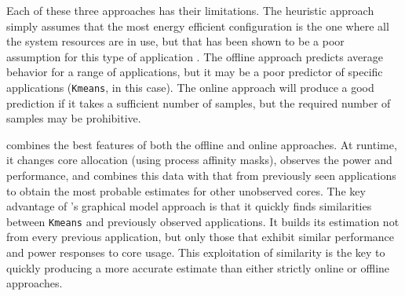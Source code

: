 Each of these three approaches has their limitations.  The heuristic
approach simply assumes that the most energy efficient configuration
is the one where all the system resources are in use, but that has
been shown to be a poor assumption for this type of application
\cite{HotPower,MeisnerISCA2011}.  The offline approach predicts
average behavior for a range of applications, but it may be a poor
predictor of specific applications (\texttt{Kmeans}, in this case).  The online
approach will produce a good prediction if it takes a sufficient
number of samples, but the required number of samples may be
prohibitive.

\SYSTEMLEO{} combines the best features of both the offline and online
approaches.  At runtime, it changes core allocation (using process
affinity masks), observes the power and performance, and combines this
data with that from previously seen applications to obtain the most
probable estimates for other unobserved cores.  
The key advantage of \SYSTEMLEO{}'s graphical model approach is
that it quickly finds similarities between \texttt{Kmeans} and previously
observed applications.  It builds its estimation not from every
previous application, but only those that exhibit similar performance
and power responses to core usage.  This exploitation of similarity is
the key to quickly producing a more accurate estimate than either
strictly online or offline approaches.


